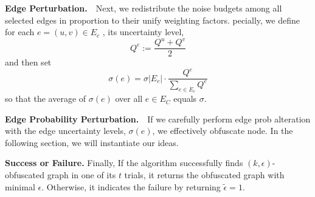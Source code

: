 \textbf{Edge Perturbation.}~~Next, we redistribute the noise budgets among all selected edges in proportion to their unify weighting factors. pecially, we define for each $e=(u,v) \in E_{c}$ , its uncertainty level, 
\begin{equation*}
    Q^{e}:= \frac{Q^{u}+Q^{v}}{2}
\end{equation*}
and then set  
\begin{equation*}
    \sigma(e)=\sigma |E_{c}|  \cdot \frac{Q^{e}}{\sum_{e \in E_{c}} Q^{e}}
\end{equation*}
so that the average of $\sigma(e)$ over all $e \in E_{C}$ equals $\sigma$.

\textbf{Edge Probability Perturbation.}~~If we carefully perform edge prob alteration with the edge uncertainty levels, $\sigma(e)$, we effectively obfuscate node. In the following section, we will instantiate our ideas.

\textbf{Success or Failure.} Finally, If the algorithm successfully finds $(k,\epsilon)$-obfuscated graph in one of its $t$ trials, it returns the obfuscated graph with minimal $\epsilon$. Otherwise, it indicates the failure by returning $\tilde{\epsilon}=1$. 
